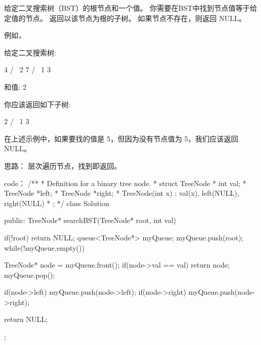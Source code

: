 给定二叉搜索树（BST）的根节点和一个值。 你需要在BST中找到节点值等于给定值的节点。 返回以该节点为根的子树。 如果节点不存在，则返回 NULL。

例如，

给定二叉搜索树:

        4
       / \
      2   7
     / \
    1   3

和值: 2

你应该返回如下子树:

      2     
     / \   
    1   3

在上述示例中，如果要找的值是 5，但因为没有节点值为 5，我们应该返回 NULL。































思路：
层次遍历节点，找到即返回。




























code：
/**
 * Definition for a binary tree node.
 * struct TreeNode {
 *     int val;
 *     TreeNode *left;
 *     TreeNode *right;
 *     TreeNode(int x) : val(x), left(NULL), right(NULL) {}
 * };
 */
class Solution {
public:
    TreeNode* searchBST(TreeNode* root, int val) {
        if(!root) return NULL;
        queue<TreeNode*> myQueue;
        myQueue.push(root);
        while(!myQueue.empty())
        {
            TreeNode* node = myQueue.front();
            if(node->val == val) return node;
            myQueue.pop();
            
            if(node->left) myQueue.push(node->left);
            if(node->right) myQueue.push(node->right);
        }
        return NULL;
    }
};